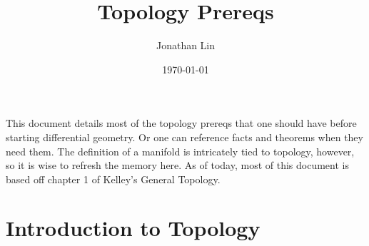 \documentclass[12pt]{article}
\title{Topology Prereqs}
\author{Jonathan Lin}
\date{\today}
\theoremstyle{plain}
\theoremstyle{definition}
\begin{document}
\maketitle

This document details most of the topology prereqs that one should have before starting differential geometry. Or one can reference facts and theorems when they need them. The definition of a manifold is intricately tied to topology, however, so it is wise to refresh the memory here. As of today, most of this document is based off chapter 1 of Kelley's General Topology.

\section{Introduction to Topology}
\end{document}
